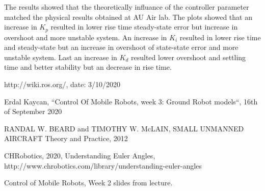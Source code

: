 \documentclass[conference]{IEEEtran}
\begin{document}
The results showed that the theoretically influance of the controller parameter matched the physical results obtained at AU Air lab. The plots showed that an increase in $K_p$ resulted in lower rise time steady-state error but increase in overshoot and more unstable system. An increase in $K_i$ resulted in lower rise time and steady-state but an increase in overshoot of state-state error and more unstable system. Last an increase in $K_d$ resulted lower overshoot and settling time and better stability but an decrease in rise time. 


\begin{thebibliography}{00}

 http://wiki.ros.org/, date: 3/10/2020

 Erdal Kaycan, ``Control Of Mobile Robots, week 3: Ground Robot models``, 16th of September 2020

 RANDAL W. BEARD and TIMOTHY W. McLAIN, SMALL UNMANNED AIRCRAFT Theory and Practice, 2012

 CHRobotics, 2020, Understanding Euler Angles, http://www.chrobotics.com/library/understanding-euler-angles

 Control of Mobile Robots, Week 2 slides from lecture.

\end{thebibliography}
\vspace{12pt}
\end{document}
